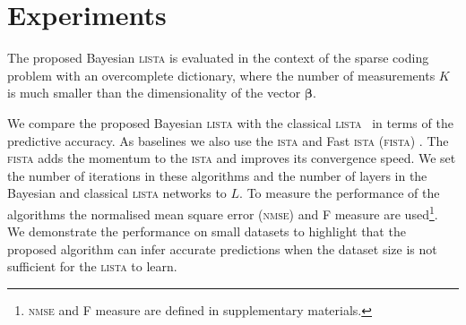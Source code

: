 \documentclass{article}
\begin{document}
\section{Experiments}
\label{sec:experiments}
The proposed Bayesian \textsc{lista} is evaluated in the context of the sparse coding problem with an overcomplete dictionary, where the number of measurements $K$ is much smaller than the dimensionality of the vector $\boldsymbol\beta$.

We compare the proposed Bayesian \textsc{lista} with the classical \textsc{lista}~\cite{gregor2010learning} in terms of the predictive accuracy. As baselines we also use the \textsc{ista} \cite{daubechies2004iterative} and Fast \textsc{ista} (\textsc{fista}) \cite{beck2009fast}. The \textsc{fista} adds the momentum to the \textsc{ista} and improves its convergence speed. We set the number of iterations in these algorithms and the number of layers in the Bayesian and classical \textsc{lista} networks to $L$. To measure the performance of the algorithms the normalised mean square error (\textsc{nmse}) and F measure are used\footnote{\textsc{nmse} and F measure are defined in supplementary materials.}. We demonstrate the performance on small datasets to highlight that the proposed algorithm can infer accurate predictions when the dataset size is not sufficient for the \textsc{lista} to learn.
\end{document}
